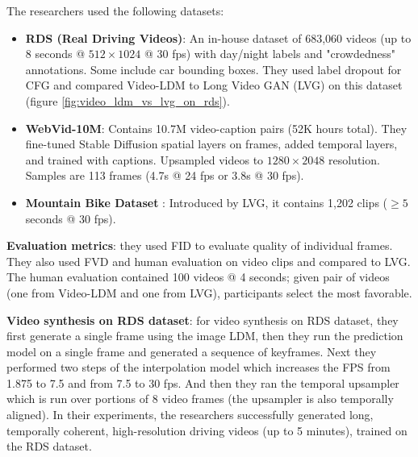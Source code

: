 The researchers used the following datasets:

\begin{itemize}
    \item \textbf{RDS (Real Driving Videos)}: An in-house dataset of 683,060 videos (up to 8 seconds @ $512\times 1024$ @ 30 fps) with day/night labels and "crowdedness" annotations. Some include car bounding boxes. They used label dropout for CFG and compared Video-LDM to Long Video GAN (LVG) on this dataset (figure \ref{fig:video_ldm_vs_lvg_on_rds}).
    \item \textbf{WebVid-10M}: Contains 10.7M video-caption pairs (52K hours total). They fine-tuned Stable Diffusion spatial layers on frames, added temporal layers, and trained with captions. Upsampled videos to $1280\times 2048$ resolution. Samples are 113 frames (4.7s @ 24 fps or 3.8s @ 30 fps).
    \item \textbf{Mountain Bike Dataset} \cite{brooks2022generating}: Introduced by LVG, it contains 1,202 clips ($\geq 5$ seconds @ 30 fps).
\end{itemize}

\textbf{Evaluation metrics}: they used FID to evaluate quality of individual frames. They also used FVD and human evaluation on video clips and compared to LVG. The human evaluation contained 100 videos @ 4 seconds; given pair of videos (one from Video-LDM and one from LVG), participants select the most favorable.

\textbf{Video synthesis on RDS dataset}: for video synthesis on RDS dataset, they first generate a single frame using the image LDM, then they run the prediction model on a single frame and generated a sequence of keyframes. Next they performed two steps of the interpolation model which increases the FPS from 1.875 to 7.5 and from 7.5 to 30 fps. And then they ran the temporal upsampler which is run over portions of 8 video frames (the upsampler is also temporally aligned). In their experiments, the researchers successfully generated long, temporally coherent, high-resolution driving videos (up to 5 minutes), trained on the RDS dataset.

